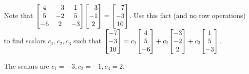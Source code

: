 \documentclass{../mathhomework}
\newenvironment{Mat}{\begin{bmatrix}}{\end{bmatrix}}
\begin{document}
\begin{problem}[1.4\#25]
    Note that $\begin{Mat}
        4 & -3 & 1 \\
        5 & -2 & 5 \\
        -6 & 2 & -3
    \end{Mat}\begin{Mat}
        -3 \\ -1 \\ 2
    \end{Mat} = \begin{Mat}
        -7 \\ -3 \\ 10
    \end{Mat}$. Use this fact (and no row operations) to find scalars $c_1, c_2, c_3$ such that
    $\begin{Mat}-7\\-3\\10\end{Mat} = c_1\begin{Mat}4\\5\\-6\end{Mat} + c_2\begin{Mat}-3\\-2\\2\end{Mat} + c_3\begin{Mat}1\\5\\-3\end{Mat}$.

    \begin{solution}
        The scalars are $c_1 = -3, c_2 = -1, c_3 = 2$.
    \end{solution}
\end{problem}
\end{document}
